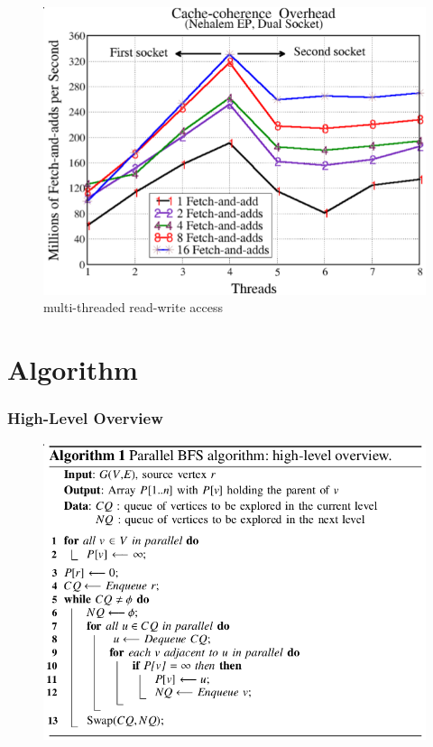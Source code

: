 \documentclass[]{beamer}
\begin{document}
\begin{frame}
\begin{figure}
{\begin{minipage}[t]{0.45\textwidth}
        \includegraphics[width=\textwidth]{figures/inter-socket-coherence}
        \caption{multi-threaded read-write access}
      \end{minipage}
    }
  \end{figure}
\end{frame}

\section{Algorithm}
\frame{\tableofcontents[currentsection]}

\begin{frame}
  \frametitle{High-Level Overview}
  \begin{figure}
    \centering
    \includegraphics[width=.8\textwidth]{figures/bfs-serial}
  \end{figure}
\end{frame}
\end{document}
